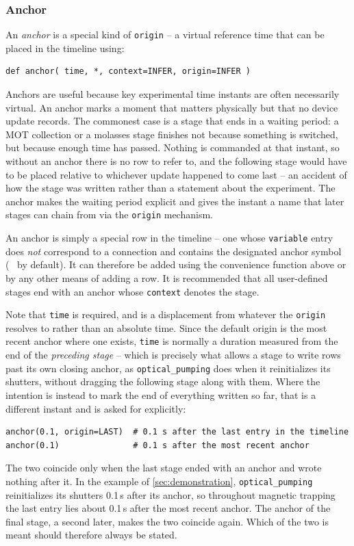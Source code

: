 \documentclass{SciPost}
\newcommand{\python}[1]{%
  \texttt{#1}%
}
\begin{document}
 
\subsubsection{Anchor}
\label{sec:anchor}
An \emph{anchor} is a special kind of \python{origin} – a virtual reference time that can be placed in the timeline using:
%
\begin{verbatim}
def anchor( time, *, context=INFER, origin=INFER )
\end{verbatim}
%
Anchors are useful because key experimental time instants are often necessarily virtual. An anchor marks a moment that matters physically but that no device update records. The commonest case is a stage that ends in a waiting period: a MOT collection or a molasses stage finishes not because something is switched, but because enough time has passed. Nothing is commanded at that instant, so without an anchor there is no row to refer to, and the following stage would have to be placed relative to whichever update happened to come last – an accident of how the stage was written rather than a statement about the experiment. The anchor makes the waiting period explicit and gives the instant a name that later stages can chain from via the \python{origin} mechanism.
 
An anchor is simply a special row in the timeline – one whose \python{variable} entry does \emph{not} correspond to a connection and contains the designated anchor symbol (\faAnchor~ by default). It can therefore be added using the convenience function above or by any other means of adding a row. It is recommended that all user-defined stages end with an anchor whose \python{context} denotes the stage.

Note that \python{time} is required, and is a displacement from whatever the \python{origin} resolves to rather than an absolute time. Since the default origin is the most recent anchor where one exists, \python{time} is normally a duration measured from the end of the \emph{preceding stage} – which is precisely what allows a stage to write rows past its own closing anchor, as \python{optical_pumping} does when it reinitializes its shutters, without dragging the following stage along with them. Where the intention is instead to mark the end of everything written so far, that is a different instant and is asked for explicitly:
%
\begin{verbatim}
anchor(0.1, origin=LAST)  # 0.1 s after the last entry in the timeline
anchor(0.1)               # 0.1 s after the most recent anchor
\end{verbatim}
%
The two coincide only when the last stage ended with an anchor and wrote nothing after it. In the example of \cref{sec:demonstration}, \python{optical_pumping} reinitializes its shutters 0.1\,s after its anchor, so throughout magnetic trapping the last entry lies about 0.1\,s after the most recent anchor. The anchor of the final stage, a second later, makes the two coincide again. Which of the two is meant should therefore always be stated.
 
\end{document}

